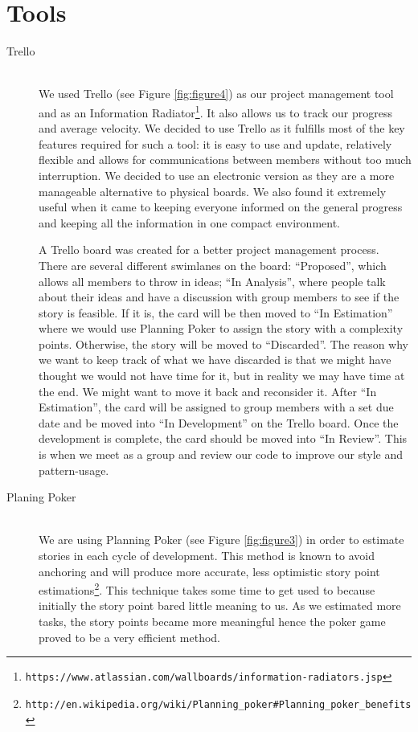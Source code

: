 \documentclass[11pt, a4paper]{article}
\begin{document}
\section{Tools}
\begin{description}
  \item[Trello] \hfill \\
We used Trello (see Figure \ref{fig:figure4}) as our project management tool and as an Information Radiator\footnote{\tt{https://www.atlassian.com/wallboards/information-radiators.jsp}}. It also allows us to track our progress and average velocity. We decided to use Trello as it fulfills most of the key features required for such a tool: it is easy to use and update, relatively flexible and allows for communications between members without too much interruption. We decided to use an electronic version as they are a more manageable alternative to physical boards. We also found it extremely useful when it came to keeping everyone informed on the general progress and keeping all the information in one compact environment.

A Trello board was created for a better project management process. There are several different swimlanes on the board: ``Proposed'', which allows all members to throw in ideas; ``In Analysis'', where people talk about their ideas and have a discussion with group members to see if the story is feasible. If it is, the card will be then moved to ``In Estimation'' where we would use Planning Poker to assign the story with a complexity points. Otherwise, the story will be moved to ``Discarded''. The reason why we want to keep track of what we have discarded is that we might have thought we would not have time for it, but in reality we may have time at the end. We might want to move it back and reconsider it. After ``In Estimation'', the card will be assigned to group members with a set due date and be moved into ``In Development'' on the Trello board. Once the development is complete, the card should be moved into ``In Review''. This is when we meet as a group and review our code to improve our style and pattern-usage.  

  \item[Planing Poker] \hfill \\
We are using Planning Poker (see Figure \ref{fig:figure3}) in order to estimate stories in each cycle of development. This method is known to avoid anchoring and will produce more accurate, less optimistic story point estimations\footnote{\tt{http://en.wikipedia.org/wiki/Planning\_poker\#Planning\_poker\_benefits}}. This technique takes some time to get used to because initially the story point bared little meaning to us. As we estimated more tasks, the story points became more meaningful hence the poker game proved to be a very efficient method.


\end{description}
\end{document}
